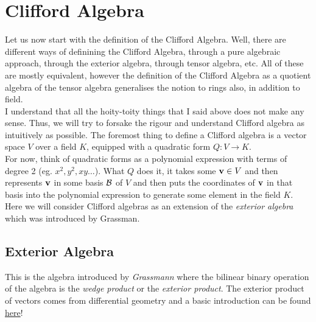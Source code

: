 \section{Clifford Algebra}
Let us now start with the definition of the Clifford Algebra. Well, there are different ways of definining the Clifford Algebra, through a pure algebraic approach, through the exterior algebra, through tensor algebra, etc. All of these are mostly equivalent, however the definition of the Clifford Algebra as a quotient algebra of the tensor algebra generalises the notion to rings also, in addition to field. \\[0.2cm]
I understand that all the hoity-toity things that I said above does not make any sense. Thus, we will try to forsake the rigour and understand Clifford algebra as intuitively as possible. The foremost thing to define a Clifford algebra is a vector space $V$ over a field $K$, equipped with a quadratic form $Q:V\to K$.\\[0.2cm] For now, think of quadratic forms as a polynomial expression with terms of degree 2 (eg. $x^2,y^2,xy\ldots$). What $Q$ does it, it takes some $\vb{v}\in V$ and then represents $\vb{v}$ in some basis $\mathcal B$ of $V$ and then puts the coordinates of $\vb{v}$ in that basis into the polynomial expression to generate some element in the field $K$. \\[0.2cm]
Here we will consider Clifford algebras as an extension of the \textit{exterior algebra} which was introduced by Grassman.
\subsection{Exterior Algebra}
This is the algebra introduced by \textit{Grassmann} where the bilinear binary operation of the algebra is the \textit{wedge product} or the \textit{exterior product}. The exterior product of vectors comes from differential geometry and a basic introduction can be found \href{https://raw.githubusercontent.com/LoneWolf1304/Notes/main/Tensor%20Analysis/main.pdf}{here}!